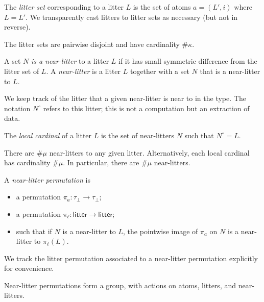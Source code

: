 \documentclass{article}
\begin{document}
\begin{definition}
    The \emph{litter set} corresponding to a litter \( L \) is the set of atoms \( a = (L', i) \) where \( L = L' \).
    We transparently cast litters to litter sets as necessary (but not in reverse).
\end{definition}
\begin{lemma}
    The litter sets are pairwise disjoint and have cardinality \( \#\kappa \).
\end{lemma}
\begin{definition}
    A set \( N \) \emph{is a near-litter} to a litter \( L \) if it has small symmetric difference from the litter set of \( L \).
    A \emph{near-litter} is a litter \( L \) together with a set \( N \) that is a near-litter to \( L \).
\end{definition}
\begin{remark}
    We keep track of the litter that a given near-litter is near to in the type.
    The notation \( N^\circ \) refers to this litter; this is not a computation but an extraction of data.
\end{remark}
\begin{definition}
    The \emph{local cardinal} of a litter \( L \) is the set of near-litters \( N \) such that \( N^\circ = L \).
\end{definition}
\begin{lemma}
    There are \( \#\mu \) near-litters to any given litter.
    Alternatively, each local cardinal has cardinality \( \#\mu \).
    In particular, there are \( \#\mu \) near-litters.
\end{lemma}
\begin{definition}
    A \emph{near-litter permutation} is
    \begin{itemize}
        \item a permutation \( \pi_a \colon \tau_\bot \to \tau_\bot \);
        \item a permutation \( \pi_\ell \colon \mathsf{litter} \to \mathsf{litter} \);
        \item such that if \( N \) is a near-litter to \( L \), the pointwise image of \( \pi_a \) on \( N \) is a near-litter to \( \pi_\ell(L) \).
    \end{itemize}
\end{definition}
\begin{remark}
    We track the litter permutation associated to a near-litter permutation explicitly for convenience.
\end{remark}
\begin{lemma}
    Near-litter permutations form a group, with actions on atoms, litters, and near-litters.
\end{lemma}
\end{document}
